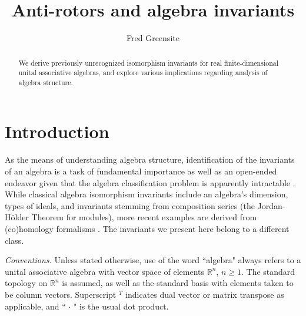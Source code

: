 \documentclass{amsart}
\theoremstyle{definition}
\numberwithin{theorem}{section}
\numberwithin{equation}{section}
\begin{document}
 

    
    \title{Anti-rotors and algebra invariants}
    
       \author{Fred Greensite}
 
       \begin{abstract} We derive previously unrecognized isomorphism invariants for real finite-dimensional unital associative algebras, and explore various implications regarding analysis of algebra structure. 
   \end{abstract}
   
    \maketitle
    


\section{Introduction}
As the means of understanding algebra structure, identification of the invariants of an algebra is a task of fundamental importance as well as an open-ended endeavor given that the algebra classification problem is apparently intractable \cite{eom:2024,belitskii:2005}.  While classical algebra isomorphism invariants include an algebra's dimension, types of ideals, and invariants stemming from composition series (the Jordan-H\"older Theorem for modules), more recent examples are derived from (co)homology formalisms \cite{hochschild:1945,gerstenhaber:1964,loday:1998}.  The invariants we present here belong to a different class.  

\bigskip

{\it Conventions.} Unless stated otherwise, use of the word ``algebra" always refers to a unital associative algebra with vector space of elements $\mathbb{R}^n$, $n\ge 1$.  The standard topology on $\mathbb{R}^n$ is assumed, as well as the standard basis with elements taken to be column vectors.  Superscript $^T$ indicates dual vector or matrix transpose as applicable, and ``$\,\cdot\,$" is the usual dot product.  
\end{document}
